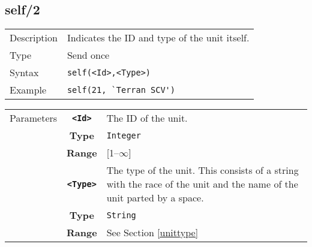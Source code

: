 \subsection{self/2}
\begin{tabularx}{\textwidth}{lX}
 Description & Indicates the ID and type of the unit itself. \\
 Type & Send once \\
 Syntax & \verb|self(<Id>,<Type>)| \\
 Example & \verb|self(21, `Terran SCV')|   \\
 \end{tabularx}
 \begin{tabularx}{\textwidth}{l | c | p{8cm}|}
 \cline{2-3}
 Parameters & \textbf{\verb|<Id>|} & The ID of the unit.\\
            & \textbf{Type} & \verb|Integer| \\
            & \textbf{Range} & [1--$\infty$] \\
            \cline{2-3}
            & \textbf{\verb|<Type>|} & The type of the unit. This consists of a string with the race of the unit and the name of the unit parted by a space. \\
            & \textbf{Type} & \verb|String| \\
            & \textbf{Range} & See Section \ref{unittype} \\
            \cline{2-3}
\end{tabularx}

